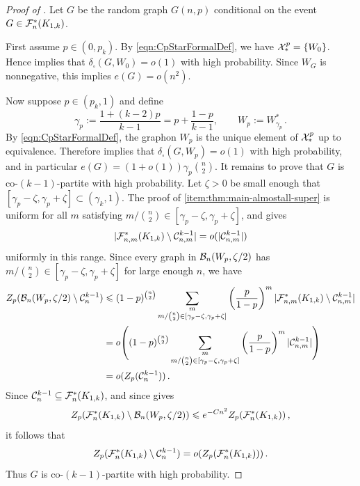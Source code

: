 \begin{proof}[Proof of ]
Let $G$ be the \erdosrenyi{} random graph $G(n,p)$ conditional on the event $G\in{\mathcal F}^\ast_n(K_{1,k})$.

First assume $p\in(0,p_k)$. By \eqref{eqn:CpStarFormalDef}, we have ${\mathcal X}^p_\ast=\{W_0\}$. Hence  implies that $\delta_\square(G,W_0)=o(1)$ with high probability. Since $W_G$ is nonnegative, this implies $e(G)=o(n^2)$.

Now suppose $p\in(p_k,1)$ and define
$$\gamma_p:=\frac{1+(k-2)p}{k-1}=p+\frac{1-p}{k-1},\qquad W_p:=W^\ast_{\gamma_p}\,.$$
By \eqref{eqn:CpStarFormalDef}, the graphon $W_p$ is the unique element of ${\mathcal X}^p_\ast$ up to equivalence. Therefore  implies that $\delta_\square(G,W_p)=o(1)$ with high probability, and in particular $e(G)=(1+o(1))\gamma_p\binom n2$. It remains to prove that $G$ is co-$(k-1)$-partite with high probability. Let $\zeta>0$ be small enough that $[\gamma_p-\zeta,\gamma_p+\zeta]\subset(\gamma_k,1)$. The proof of  \ref{item:thm:main-almostall-super} is uniform for all $m$ satisfying $m/\binom n2\in[\gamma_p-\zeta,\gamma_p+\zeta]$, and gives
$$|{\mathcal F}^\ast_{n,m}(K_{1,k})\setminus{\mathcal C}^{k-1}_{n,m}|=o(|{\mathcal C}^{k-1}_{n,m}|)$$
uniformly in this range. Since every graph in ${\mathcal B}_n(W_p,\zeta/2)$ has $m/\binom n2\in[\gamma_p-\zeta,\gamma_p+\zeta]$ for large enough $n$, we have
\begin{align*}
Z_p(\cB_n(W_p,\zeta/2)\setminus\cC^{k-1}_n)&\leq (1-p)^{\binom n2}\sum_{\substack{m\\ m/\binom n2\in[\gamma_p-\zeta,\gamma_p+\zeta]}}\left(\frac{p}{1-p}\right)^m|\cF^\ast_{n,m}(K_{1,k})\setminus\cC^{k-1}_{n,m}| \\
&= o\vast((1-p)^{\binom n2}\sum_{\substack{m\\ m/\binom n2\in[\gamma_p-\zeta,\gamma_p+\zeta]}}\left(\frac{p}{1-p}\right)^m|\cC^{k-1}_{n,m}|\vast) \\
&= o(Z_p(\cC^{k-1}_n))\,.
\end{align*}
Since ${\mathcal C}^{k-1}_n\subseteq{\mathcal F}^\ast_n(K_{1,k})$, and since  gives
$$Z_p({\mathcal F}^\ast_n(K_{1,k})\setminus{\mathcal B}_n(W_p,\zeta/2))\leqslant e^{-Cn^2}Z_p({\mathcal F}^\ast_n(K_{1,k}))\,,$$
it follows that
$$Z_p({\mathcal F}^\ast_n(K_{1,k})\setminus{\mathcal C}^{k-1}_n)=o(Z_p({\mathcal F}^\ast_n(K_{1,k})))\,.$$
Thus $G$ is co-$(k-1)$-partite with high probability.


\end{proof}
